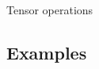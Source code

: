 \documentclass[10pt]{beamer}
\begin{document}
\begin{frame}{Tensor operations}
		

		
		
%				
	\end{frame}
	
	\subsection{Examples}
\end{document}
